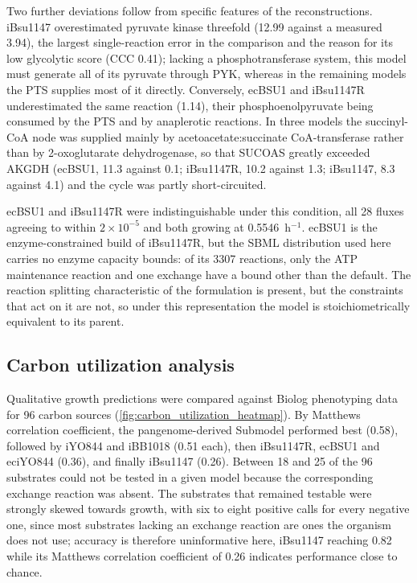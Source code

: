 \documentclass[11pt, a4paper]{article}
\begin{document}
Two further deviations follow from specific features of the reconstructions. iBsu1147 overestimated pyruvate kinase threefold (12.99 against a measured 3.94), the largest single-reaction error in the comparison and the reason for its low glycolytic score (CCC 0.41); lacking a phosphotransferase system, this model must generate all of its pyruvate through PYK, whereas in the remaining models the PTS supplies most of it directly. Conversely, ecBSU1 and iBsu1147R underestimated the same reaction (1.14), their phosphoenolpyruvate being consumed by the PTS and by anaplerotic reactions. In three models the succinyl-CoA node was supplied mainly by acetoacetate:succinate CoA-transferase rather than by 2-oxoglutarate dehydrogenase, so that SUCOAS greatly exceeded AKGDH (ecBSU1, 11.3 against 0.1; iBsu1147R, 10.2 against 1.3; iBsu1147, 8.3 against 4.1) and the cycle was partly short-circuited.

ecBSU1 and iBsu1147R were indistinguishable under this condition, all 28 fluxes agreeing to within $2\times10^{-5}$ and both growing at 0.5546~h$^{-1}$. ecBSU1 is the enzyme-constrained build of iBsu1147R, but the SBML distribution used here carries no enzyme capacity bounds: of its 3307 reactions, only the ATP maintenance reaction and one exchange have a bound other than the default. The reaction splitting characteristic of the formulation is present, but the constraints that act on it are not, so under this representation the model is stoichiometrically equivalent to its parent.

\subsection{Carbon utilization analysis}

Qualitative growth predictions were compared against Biolog phenotyping data \parencite{oh-2007} for 96 carbon sources (\autoref{fig:carbon_utilization_heatmap}). By Matthews correlation coefficient, the pangenome-derived Submodel performed best (0.58), followed by iYO844 and iBB1018 (0.51 each), then iBsu1147R, ecBSU1 and eciYO844 (0.36), and finally iBsu1147 (0.26). Between 18 and 25 of the 96 substrates could not be tested in a given model because the corresponding exchange reaction was absent. The substrates that remained testable were strongly skewed towards growth, with six to eight positive calls for every negative one, since most substrates lacking an exchange reaction are ones the organism does not use; accuracy is therefore uninformative here, iBsu1147 reaching 0.82 while its Matthews correlation coefficient of 0.26 indicates performance close to chance.
\end{document}
